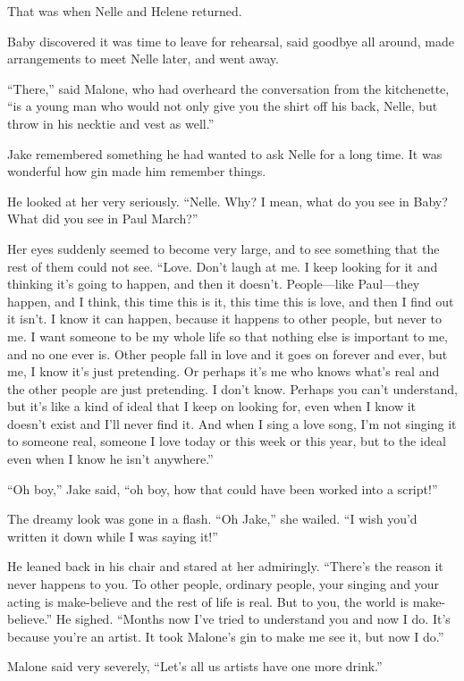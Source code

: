 \documentclass{novel}
\begin{document}
That was when Nelle and Helene returned.

Baby discovered it was time to leave for rehearsal, said goodbye all around, made arrangements to meet Nelle later, and went away.

“There,” said Malone, who had overheard the conversation from the kitchenette, “is a young man who would not only give you the shirt off his back, Nelle, but throw in his necktie and vest as well.”

Jake remembered something he had wanted to ask Nelle for a long time. It was wonderful how gin made him remember things.

He looked at her very seriously. “Nelle. Why? I mean, what do you see in Baby? What did you see in Paul March?”

Her eyes suddenly seemed to become very large, and to see something that the rest of them could not see. “Love. Don’t laugh at me. I keep looking for it and thinking it’s going to happen, and then it doesn’t. People—like Paul—they happen, and I think, this time this is it, this time this is love, and then I find out it isn’t. I know it can happen, because it happens to other people, but never to me. I want someone to be my whole life so that nothing else is important to me, and no one ever is. Other people fall in love and it goes on forever and ever, but me, I know it’s just pretending. Or perhaps it’s me who knows what’s real and the other people are just pretending. I don’t know. Perhaps you can’t understand, but it’s like a kind of ideal that I keep on looking for, even when I know it doesn’t exist and I’ll never find it. And when I sing a love song, I’m not singing it to someone real, someone I love today or this week or this year, but to the ideal even when I know he isn’t anywhere.”

“Oh boy,” Jake said, “oh boy, how that could have been worked into a script!”

The dreamy look was gone in a flash. “Oh Jake,” she wailed. “I wish you’d written it down while I was saying it!”

He leaned back in his chair and stared at her admiringly. “There’s the reason it never happens to you. To other people, ordinary people, your singing and your acting is make-believe and the rest of life is real. But to you, the world is make-believe.” He sighed. “Months now I've tried to understand you and now I do. It’s because you’re an artist. It took Malone’s gin to make me see it, but now I do.”

Malone said very severely, “Let’s all us artists have one more drink.”
\end{document}

